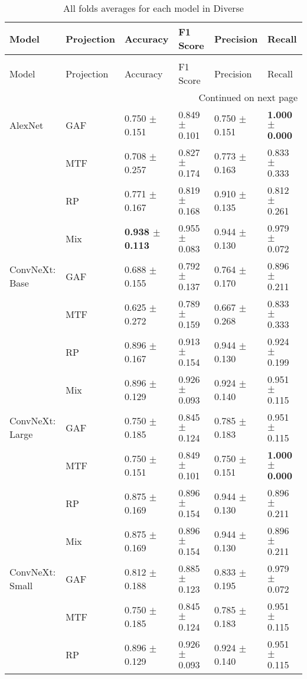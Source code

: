 \begin{longtable}[t]{llllll}
\caption{All folds averages for each model in Diverse} \\
\toprule
Model & Projection & Accuracy & F1 Score & Precision & Recall \\
\midrule
\endfirsthead
\caption[]{All folds averages for each model in Diverse} \\
\toprule
Model & Projection & Accuracy & F1 Score & Precision & Recall \\
\midrule
\endhead
\midrule
\multicolumn{6}{r}{Continued on next page} \\
\midrule
\endfoot
\bottomrule
\endlastfoot
AlexNet & GAF & 0.750 $\pm$ 0.151 & 0.849 $\pm$ 0.101 & 0.750 $\pm$ 0.151 & \textbf{1.000 $\pm$ 0.000} \\
 & MTF & 0.708 $\pm$ 0.257 & 0.827 $\pm$ 0.174 & 0.773 $\pm$ 0.163 & 0.833 $\pm$ 0.333 \\
 & RP & 0.771 $\pm$ 0.167 & 0.819 $\pm$ 0.168 & 0.910 $\pm$ 0.135 & 0.812 $\pm$ 0.261 \\
 & Mix & \textbf{0.938 $\pm$ 0.113} & 0.955 $\pm$ 0.083 & 0.944 $\pm$ 0.130 & 0.979 $\pm$ 0.072 \\
ConvNeXt: Base & GAF & 0.688 $\pm$ 0.155 & 0.792 $\pm$ 0.137 & 0.764 $\pm$ 0.170 & 0.896 $\pm$ 0.211 \\
 & MTF & 0.625 $\pm$ 0.272 & 0.789 $\pm$ 0.159 & 0.667 $\pm$ 0.268 & 0.833 $\pm$ 0.333 \\
 & RP & 0.896 $\pm$ 0.167 & 0.913 $\pm$ 0.154 & 0.944 $\pm$ 0.130 & 0.924 $\pm$ 0.199 \\
 & Mix & 0.896 $\pm$ 0.129 & 0.926 $\pm$ 0.093 & 0.924 $\pm$ 0.140 & 0.951 $\pm$ 0.115 \\
ConvNeXt: Large & GAF & 0.750 $\pm$ 0.185 & 0.845 $\pm$ 0.124 & 0.785 $\pm$ 0.183 & 0.951 $\pm$ 0.115 \\
 & MTF & 0.750 $\pm$ 0.151 & 0.849 $\pm$ 0.101 & 0.750 $\pm$ 0.151 & \textbf{1.000 $\pm$ 0.000} \\
 & RP & 0.875 $\pm$ 0.169 & 0.896 $\pm$ 0.154 & 0.944 $\pm$ 0.130 & 0.896 $\pm$ 0.211 \\
 & Mix & 0.875 $\pm$ 0.169 & 0.896 $\pm$ 0.154 & 0.944 $\pm$ 0.130 & 0.896 $\pm$ 0.211 \\
ConvNeXt: Small & GAF & 0.812 $\pm$ 0.188 & 0.885 $\pm$ 0.123 & 0.833 $\pm$ 0.195 & 0.979 $\pm$ 0.072 \\
 & MTF & 0.750 $\pm$ 0.185 & 0.845 $\pm$ 0.124 & 0.785 $\pm$ 0.183 & 0.951 $\pm$ 0.115 \\
 & RP & 0.896 $\pm$ 0.129 & 0.926 $\pm$ 0.093 & 0.924 $\pm$ 0.140 & 0.951 $\pm$ 0.115 \\

\end{longtable}
